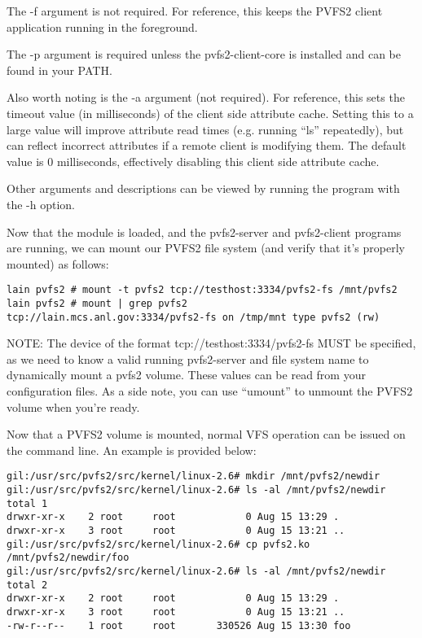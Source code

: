 \documentclass[11pt, letterpaper]{article}
\begin{document}
The -f argument is not required.  For reference, this keeps the PVFS2
client application running in the foreground.

The -p argument is required unless the pvfs2-client-core is installed
and can be found in your PATH.

Also worth noting is the -a argument (not required).  For reference,
this sets the timeout value (in milliseconds) of the client side
attribute cache.  Setting this to a large value will improve attribute
read times (e.g. running ``ls'' repeatedly), but can reflect incorrect
attributes if a remote client is modifying them.  The default value is
0 milliseconds, effectively disabling this client side attribute
cache.

Other arguments and descriptions can be viewed by running the program
with the -h option.

Now that the module is loaded, and the pvfs2-server and pvfs2-client
programs are running, we can mount our PVFS2 file system (and verify
that it's properly mounted) as follows:

\begin{verbatim}
lain pvfs2 # mount -t pvfs2 tcp://testhost:3334/pvfs2-fs /mnt/pvfs2
lain pvfs2 # mount | grep pvfs2
tcp://lain.mcs.anl.gov:3334/pvfs2-fs on /tmp/mnt type pvfs2 (rw)
\end{verbatim}

NOTE: The device of the format tcp://testhost:3334/pvfs2-fs MUST be
specified, as we need to know a valid running pvfs2-server and file
system name to dynamically mount a pvfs2 volume.  These values can be
read from your configuration files.  As a side note, you can use
``umount'' to unmount the PVFS2 volume when you're ready.

Now that a PVFS2 volume is mounted, normal VFS operation can be issued
on the command line.  An example is provided below:

\begin{verbatim}
gil:/usr/src/pvfs2/src/kernel/linux-2.6# mkdir /mnt/pvfs2/newdir
gil:/usr/src/pvfs2/src/kernel/linux-2.6# ls -al /mnt/pvfs2/newdir
total 1
drwxr-xr-x    2 root     root            0 Aug 15 13:29 .
drwxr-xr-x    3 root     root            0 Aug 15 13:21 ..
gil:/usr/src/pvfs2/src/kernel/linux-2.6# cp pvfs2.ko
/mnt/pvfs2/newdir/foo
gil:/usr/src/pvfs2/src/kernel/linux-2.6# ls -al /mnt/pvfs2/newdir
total 2
drwxr-xr-x    2 root     root            0 Aug 15 13:29 .
drwxr-xr-x    3 root     root            0 Aug 15 13:21 ..
-rw-r--r--    1 root     root       330526 Aug 15 13:30 foo
\end{verbatim}
\end{document}
